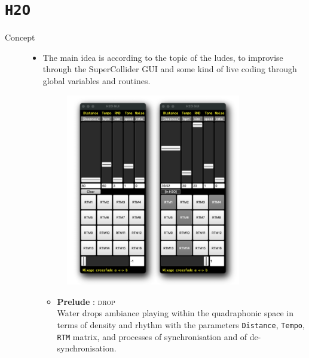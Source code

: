 
\section*{\texttt{H2O}}

\thispagestyle{empty}

\bigskip

\begin{description}
\item[Concept] \hfill 
	\begin{itemize}
	\item[] The main idea is according to the topic of the ludes, to improvise through the SuperCollider GUI and some kind of live coding through global variables and routines.
	\begin{figure}[H]
	\hfill \includegraphics[width=0.8\textwidth]{mp/img/7589}
	\end{figure}
		\begin{itemize}[leftmargin=0.4in]
		\item \textbf{Prelude} : \textsc{drop} \\ Water drops ambiance playing within the quadraphonic space in terms of density and rhythm with the parameters \texttt{Distance}, \texttt{Tempo}, \texttt{RTM} matrix, and processes of synchronisation and of de-synchronisation.

\end{itemize}
\end{itemize}
\end{description}
